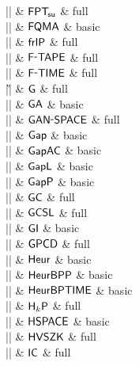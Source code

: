 |\FPTsu|    & ${{\mathsf{FPT}}_{{\kern-.10em}{\mathsf{su}}}}$ & full \\

|\FQMA|    & ${\mathsf{FQMA}}$ & basic \\

|\frIP|    & ${\mathsf{frIP}}$ & full \\

|\FTAPE|    & $\FTAPE$ & full \\

|\FTIME|    & $\FTIME$ & full \\

|\G|    & ${\mathsf{G}}$ & full \\

|\GA|    & ${\mathsf{GA}}$ & basic \\

|\GANSPACE|    & $\GANSPACE$ & full \\

|\Gap|    & ${\mathsf{Gap}}$ & basic \\

|\GapAC|    & ${\mathsf{GapAC}}$ & basic \\

|\GapL|    & ${\mathsf{GapL}}$ & basic \\

|\GapP|    & ${\mathsf{GapP}}$ & basic \\

|\GC|    & ${\mathsf{GC}}$ & full \\

|\GCSL|    & ${\mathsf{GCSL}}$ & full \\

|\GI|    & ${\mathsf{GI}}$ & basic \\

|\GPCD|    & ${\mathsf{GPCD}}$ & full \\

|\Heur|    & ${\mathsf{Heur}}$ & basic \\

|\HeurBPP|    & ${\mathsf{HeurBPP}}$ & basic \\

|\HeurBPTIME|    & ${\mathsf{HeurBPTIME}}$ & basic \\

|\HkP|    & ${{\mathsf{H}}_k{\mathsf{P}}}$ & full \\

|\HSPACE|    & ${\mathsf{HSPACE}}$ & basic \\

|\HVSZK|    & ${\mathsf{HVSZK}}$ & full \\

|\IC|    & ${\mathsf{IC}}$ & full \\

